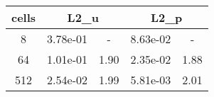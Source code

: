 \documentclass[10pt]{report}
\begin{document}
\begin{table}[H]
\begin{center}
\begin{tabular}{|c|c|c|c|c|} \hline
cells & 
\multicolumn{2}{|c|}{L2_u} & 
\multicolumn{2}{|c|}{L2_p}\\ \hline
8 & 3.78e-01 & - & 8.63e-02 & -\\ \hline
64 & 1.01e-01 & 1.90 & 2.35e-02 & 1.88\\ \hline
512 & 2.54e-02 & 1.99 & 5.81e-03 & 2.01\\ \hline
\end{tabular}
\end{center}
\end{table}
\end{document}

